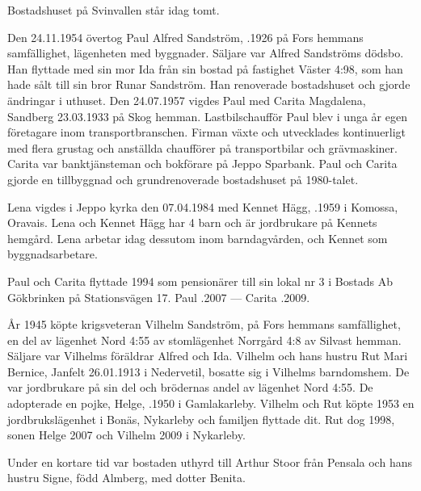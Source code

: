 Bostadshuset på Svinvallen står idag tomt.



Den 24.11.1954 övertog Paul Alfred Sandström, .1926 på Fors hemmans samfällighet, lägenheten med byggnader. Säljare var Alfred Sandströms dödsbo. Han flyttade med sin mor Ida från sin bostad på fastighet Väster 4:98, som han hade sålt till sin bror Runar Sandström. Han renoverade bostadshuset och gjorde ändringar i uthuset. Den 24.07.1957 vigdes Paul med Carita Magdalena, \textborn Sandberg 23.03.1933 på Skog hemman. Lastbilschaufför Paul blev i unga år egen företagare inom transportbranschen. Firman växte och utvecklades kontinuerligt med flera grustag och anställda chaufförer på transportbilar och grävmaskiner. Carita var banktjänsteman och bokförare på Jeppo Sparbank. Paul och Carita gjorde en tillbyggnad och grundrenoverade bostadshuset på 1980-talet.
\begin{jhchildren}
  \item {}
  \item {}
\end{jhchildren}
Lena vigdes i Jeppo kyrka den 07.04.1984 med Kennet Hägg, .1959 i Komossa, Oravais. Lena och Kennet Hägg har 4 barn och är jordbrukare på Kennets hemgård. Lena arbetar idag dessutom inom barndagvården, och Kennet som byggnadsarbetare.

Paul och Carita flyttade 1994 som pensionärer till sin lokal nr 3 i Bostads Ab Gökbrinken på Stationsvägen 17.
Paul .2007  ---  Carita .2009.


År 1945 köpte krigsveteran Vilhelm Sandström,  på Fors hemmans samfällighet, en del av lägenhet Nord 4:55 av stomlägenhet Norrgård 4:8 av Silvast hemman. Säljare var Vilhelms föräldrar Alfred och Ida. Vilhelm och hans hustru Rut Mari Bernice, \textborn Janfelt 26.01.1913 i Nedervetil, bosatte sig i Vilhelms barndomshem. De var jordbrukare på sin del och brödernas andel av lägenhet Nord 4:55. De adopterade en pojke, Helge, .1950 i Gamlakarleby. Vilhelm och Rut köpte 1953 en jordbrukslägenhet i Bonäs, Nykarleby och familjen flyttade dit. Rut dog 1998, sonen Helge 2007 och Vilhelm 2009 i Nykarleby.

Under en kortare tid var bostaden uthyrd till Arthur Stoor från Pensala och hans hustru Signe, född Almberg, med dotter Benita.


